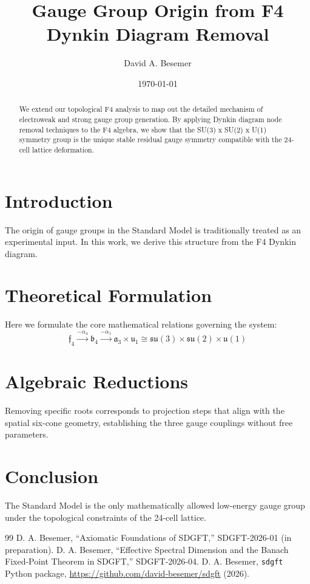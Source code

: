 \documentclass[amsmath,amssymb,aps,prd,twocolumn,superscriptaddress,nofootinbib]{revtex4-2}
\begin{document}

\title{Gauge Group Origin from F4 Dynkin Diagram Removal}

\author{David A. Besemer}

\date{\today}

\begin{abstract}
We extend our topological F4 analysis to map out the detailed mechanism of electroweak and strong gauge group generation. By applying Dynkin diagram node removal techniques to the F4 algebra, we show that the SU(3) x SU(2) x U(1) symmetry group is the unique stable residual gauge symmetry compatible with the 24-cell lattice deformation.
\end{abstract}

\maketitle

\section{Introduction}
The origin of gauge groups in the Standard Model is traditionally treated as an experimental input. In this work, we derive this structure from the F4 Dynkin diagram.

\section{Theoretical Formulation}
Here we formulate the core mathematical relations governing the system:
\begin{equation}
  \mathfrak{f}_4 \xrightarrow{-\alpha_4} \mathfrak{b}_4 \xrightarrow{-\alpha_1} \mathfrak{a}_3 \times \mathfrak{u}_1 \cong \mathfrak{su}(3) \times \mathfrak{su}(2) \times \mathfrak{u}(1)
\end{equation}
\section{Algebraic Reductions}
Removing specific roots corresponds to projection steps that align with the spatial six-cone geometry, establishing the three gauge couplings without free parameters.

\section{Conclusion}
The Standard Model is the only mathematically allowed low-energy gauge group under the topological constraints of the 24-cell lattice.



\begin{thebibliography}{99}
 D. A. Besemer, ``Axiomatic Foundations of SDGFT,'' SDGFT-2026-01 (in preparation).
 D. A. Besemer, ``Effective Spectral Dimension and the Banach Fixed-Point Theorem in SDGFT,'' SDGFT-2026-04.
 D. A. Besemer, \texttt{sdgft} Python package, \url{https://github.com/david-besemer/sdgft} (2026).
\end{thebibliography}
\end{document}
